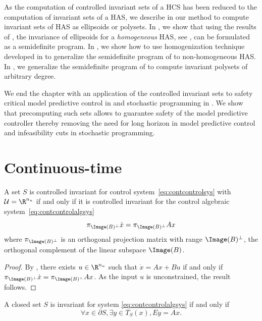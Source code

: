 \documentclass[11pt,twoside,a4paper,openright]{uclouvain-thesis}
\newcommand{\dtahcs}{HCS}
\newcommand{\dtahas}{HAS}
\newcommand{\piB}{\pi_{\Image(B)^\perp}}
\begin{document}
As the computation of controlled invariant sets of a \dtahcs{} has been reduced
to the computation of invariant sets of a \dtahas{}, we describe in
 our method to compute invariant sets of \dtahas{} as ellipsoids
or polysets.
In , we show that using the results of , the
invariance of ellipsoids for a \emph{homogeneous} \dtahas{}, see ,
can be formulated as a semidefinite program.
In , we show how to use homogenization technique developed in  to
generalize the semidefinite program of  to non-homogeneous
\dtahas{}.
In , we generalize the semidefinite program of 
to compute invariant polysets of arbitrary degree.

We end the chapter with an application of the controlled invariant sets to safety
critical model predictive control in  and stochastic programming in .
We show that precomputing such sets allows to guarantee safety of the model
predictive controller %
thereby removing the need for long horizon in model predictive control
and infeasibility cuts in stochastic programming.


\section{Continuous-time}
\label{sec:mci_continuous}

\begin{myprop}
  \label{prop:csas}
  A set $S$ is controlled invariant for control system~\eqref{eq:contcontrolsys} with $\mathcal{U} = \R^{n_u}$ if and only if
  it is controlled invariant for the control algebraic system~\eqref{eq:contcontrolalgsys}
  \[ \piB{}\dot{x} = \piB{}Ax \]
  where $\piB{}$ is an orthogonal projection matrix with range $\Image(B)^\perp$, the orthogonal complement of the linear subspace $\Image(B)$.
  \begin{proof}
    By , there exists $u \in \R^{n_u}$ such that $\dot{x} = Ax + Bu$
    if and only if $\piB{}\dot{x} = \piB{}Ax$.
    As the input $u$ is unconstrained, the result follows.
  \end{proof}
\end{myprop}

\begin{myprop}
  \label{prop:nagumo}
  A closed set $S$ is invariant for system \eqref{eq:contcontrolalgsys} if and only if
  \begin{equation}
    \label{eq:invtang}
    \forall x \in \partial S, \exists y \in T_S(x), Ey = Ax.
  \end{equation}
\end{myprop}
\end{document}
